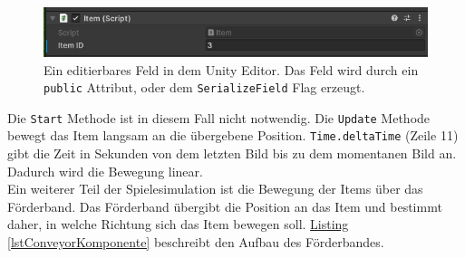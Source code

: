 \begin{figure}[H]
\centering
\includegraphics[scale=1]{Bilder/SerializeField.png}
\caption[\texttt{SerializeField}: Ein editierbares Feld in dem Unity Editor]{Ein editierbares Feld in dem Unity Editor. Das Feld wird durch ein \texttt{public} Attribut, oder dem \texttt{SerializeField} Flag erzeugt.}
\label{fig:SerializeField}
\end{figure}
Die \texttt{Start} Methode ist in diesem Fall nicht notwendig. Die \texttt{Update} Methode bewegt das Item langsam an die übergebene Position. \texttt{Time.deltaTime} (Zeile 11) gibt die Zeit in Sekunden von dem letzten Bild bis zu dem momentanen Bild an. Dadurch wird die Bewegung linear.\\
Ein weiterer Teil der Spielesimulation ist die Bewegung der Items über das Förderband. Das Förderband übergibt die Position an das Item und bestimmt daher, in welche Richtung sich das Item bewegen soll. \hyperref[lstConveyorKomponente]{Listing \ref*{lstConveyorKomponente}} beschreibt den Aufbau des Förderbandes.
